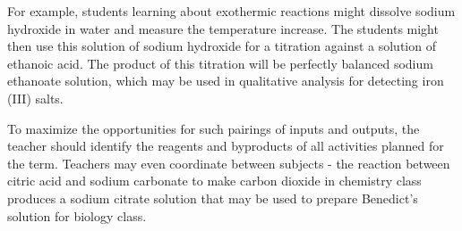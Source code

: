 For example, 
students learning about exothermic reactions might 
dissolve sodium hydroxide in water and measure the temperature increase. 
The students might then use this solution 
of sodium hydroxide for a titration against a solution of ethanoic acid. 
The product of this titration will be 
perfectly balanced sodium ethanoate solution, 
which may be used in qualitative analysis for detecting iron (III) salts.

To maximize the opportunities for such pairings of inputs and outputs, 
the teacher should identify the reagents and byproducts of 
all activities planned for the term. 
Teachers may even coordinate between subjects - 
the reaction between citric acid and sodium carbonate 
to make carbon dioxide in chemistry class 
produces a sodium citrate solution that may be used 
to prepare Benedict's solution for biology class.

